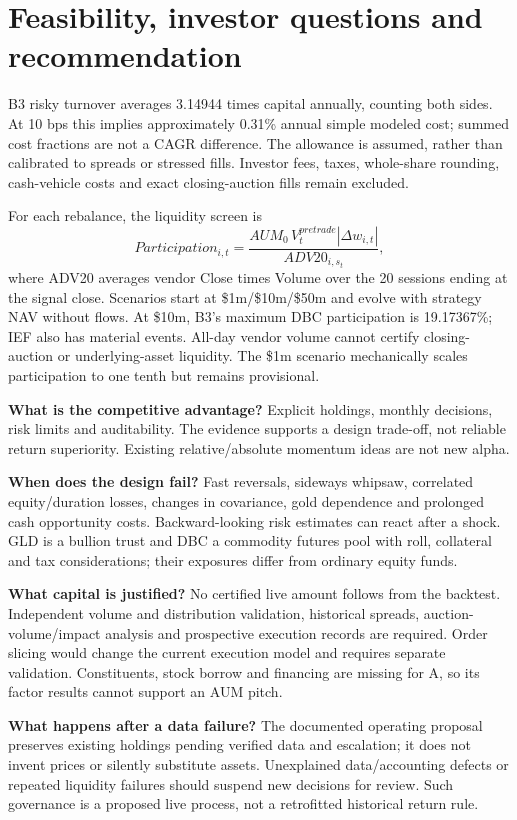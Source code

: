 \documentclass[11pt]{article}
\begin{document}
\section{Feasibility, investor questions and recommendation}
B3 risky turnover averages 3.14944 times capital annually, counting both sides. At 10 bps this implies approximately 0.31\% annual simple modeled cost; summed cost fractions are not a CAGR difference. The allowance is assumed, rather than calibrated to spreads or stressed fills. Investor fees, taxes, whole-share rounding, cash-vehicle costs and exact closing-auction fills remain excluded.

For each rebalance, the liquidity screen is
\begin{equation}
Participation_{i,t}=\frac{AUM_0\,V_t^{pretrade}|\Delta w_{i,t}|}{ADV20_{i,s_t}},
\end{equation}
where ADV20 averages vendor Close times Volume over the 20 sessions ending at the signal close. Scenarios start at \$1m/\$10m/\$50m and evolve with strategy NAV without flows. At \$10m, B3's maximum DBC participation is 19.17367\%; IEF also has material events. All-day vendor volume cannot certify closing-auction or underlying-asset liquidity. The \$1m scenario mechanically scales participation to one tenth but remains provisional.

\textbf{What is the competitive advantage?} Explicit holdings, monthly decisions, risk limits and auditability. The evidence supports a design trade-off, not reliable return superiority. Existing relative/absolute momentum ideas are not new alpha.

\textbf{When does the design fail?} Fast reversals, sideways whipsaw, correlated equity/duration losses, changes in covariance, gold dependence and prolonged cash opportunity costs. Backward-looking risk estimates can react after a shock. GLD is a bullion trust and DBC a commodity futures pool with roll, collateral and tax considerations; their exposures differ from ordinary equity funds.

\textbf{What capital is justified?} No certified live amount follows from the backtest. Independent volume and distribution validation, historical spreads, auction-volume/impact analysis and prospective execution records are required. Order slicing would change the current execution model and requires separate validation. Constituents, stock borrow and financing are missing for A, so its factor results cannot support an AUM pitch.

\textbf{What happens after a data failure?} The documented operating proposal preserves existing holdings pending verified data and escalation; it does not invent prices or silently substitute assets. Unexplained data/accounting defects or repeated liquidity failures should suspend new decisions for review. Such governance is a proposed live process, not a retrofitted historical return rule.
\end{document}
